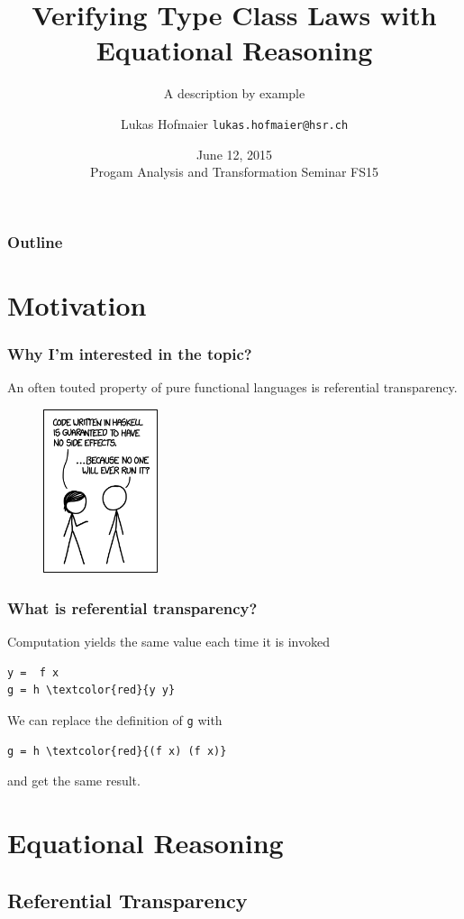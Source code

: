 \documentclass{beamer}
\title{Verifying Type Class Laws with Equational Reasoning}
\subtitle{A description by example}
\author{Lukas Hofmaier \texttt{lukas.hofmaier@hsr.ch}}
\date{June 12, 2015 \\ Progam Analysis and Transformation Seminar FS15}
\begin{document}
\maketitle
\begin{frame}
  \frametitle{Outline}
  \tableofcontents
\end{frame}

\section{Motivation}

\begin{frame}
  \frametitle{Why I'm interested in the topic?}
 An often touted property of pure functional languages is referential transparency.
\begin{figure}
  \centering
     \includegraphics[width=0.3\textwidth]{sideeffects}
\end{figure}

\end{frame}

\begin{frame}[fragile]
\frametitle{What is referential transparency?}
Computation yields the same value each time it is invoked
\begin{Verbatim}[commandchars=\\\{\}]
y =  f x
g = h \textcolor{red}{y y} 
\end{Verbatim}
We can replace the definition of \verb|g| with
\begin{Verbatim}[commandchars=\\\{\}]
g = h \textcolor{red}{(f x) (f x)}
\end{Verbatim}
and get the same result.

\end{frame}
\section{Equational Reasoning}
\subsection{Referential Transparency}
\end{document}
